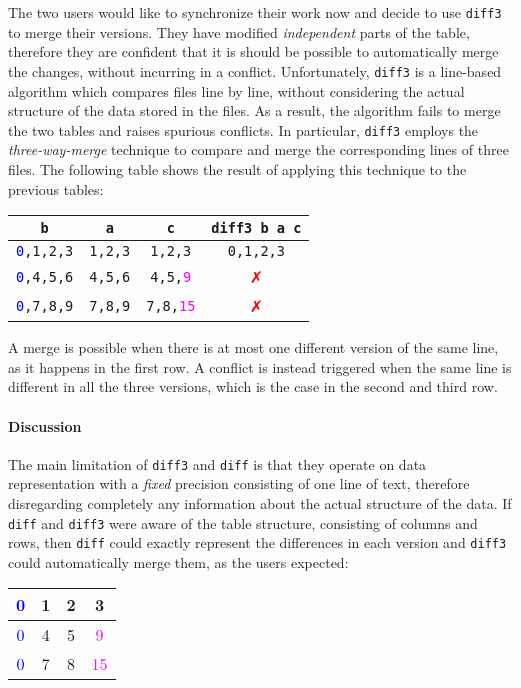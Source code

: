 \documentclass{sigplanconf}
\theoremstyle{plain}
\begin{document}
The two users would like to synchronize their work now and decide to
use \texttt{diff3} to merge their versions.
%
They have modified \emph{independent} parts of the table, therefore
they are confident that it is should be possible to automatically
merge the changes, without incurring in a conflict.
%
Unfortunately, \texttt{diff3} is a line-based algorithm which compares
files line by line, without considering the actual structure of the
data stored in the files. As a result, the algorithm fails to merge the
two tables and raises spurious conflicts.
%
In particular, \texttt{diff3} employs the \emph{three-way-merge}
technique to compare and merge the corresponding lines of three files.
%
The following table shows the result of applying this technique to the
previous tables:
\begin{center}
\begin{tabular}{| c | c | c | c |}
\hline
\texttt{b} & \texttt{a} & \texttt{c} & \texttt{diff3 b a c} \\ \hline
\texttt{\textcolor{blue}{0},1,2,3} & \texttt{1,2,3} & \texttt{1,2,3} & \textcolor{dgreen}{\texttt{0,1,2,3}} \\ \hline
\texttt{\textcolor{blue}{0},4,5,6} & \texttt{4,5,6} & \texttt{4,5,\textcolor{magenta}{9}} & \textcolor{red}{✗}  \\ \hline
\texttt{\textcolor{blue}{0},7,8,9} & \texttt{7,8,9} & \texttt{7,8,\textcolor{magenta}{15}} & \textcolor{red}{✗} \\ \hline
\end{tabular}
\end{center}
A merge is possible when there is at most one different version of the same line, as it happens in the first row.
A conflict is instead triggered when the same line is different in all the three versions, which is the case in the second and third row.


\paragraph{Discussion}
The main limitation of \texttt{diff3} and \texttt{diff} is that they
operate on data representation with a \emph{fixed} precision consisting of
one line of text, therefore disregarding completely any information
about the actual structure of the data.
%
If \texttt{diff} and \texttt{diff3} were aware of the table structure,
consisting of columns and rows, then \texttt{diff} could exactly
represent the differences in each version and \texttt{diff3} could
automatically merge them, as the users expected:
\begin{center}
\begin{tabular}{| c | c | c | c |}
\hline
\textcolor{blue}{0} & 1 & 2 & 3 \\ \hline
\textcolor{blue}{0} & 4 & 5 & \textcolor{magenta}{9} \\ \hline
\textcolor{blue}{0} & 7 & 8 & \textcolor{magenta}{15} \\ \hline
\end{tabular}
\end{center}
\end{document}
